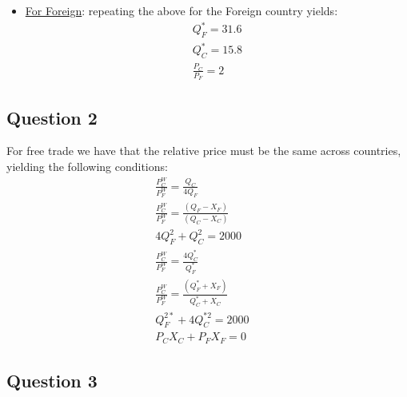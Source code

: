 \documentclass{article}
\begin{document}
\begin{itemize}
  \item  \underline{For Foreign}: repeating the above for the Foreign country yields:
  \begin{gather*}
    Q_{F}^{*} = 31.6 \\
    Q_{C}^{*} = 15.8 \\
    \tfrac{P_{C}}{P_{F}} = 2
  \end{gather*}

\end{itemize}


\par \vspace{0.8em}
\subsection{Question 2}

For free trade we have that the relative price must be the same across countries, yielding the following conditions:
\begin{align*}
  \tfrac{P_{C}^{W}}{P_{F}^{W}} = \tfrac{Q_{C}}{4Q_{F}} \ &\tag{1} \\
  \tfrac{P_{C}^{W}}{P_{F}^{W}} = \tfrac{(Q_{F}-X_{F})}{(Q_{C}-X_{C})} \ &\tag{2} \\
  4Q_{F}^{2} +  Q_{C}^{2} = 2000 \ &\tag{3} \\
  \tfrac{P_{C}^{W}}{P_{F}^{W}} = \tfrac{4Q_{C}^{*}}{Q_{F}^{*}} \ &\tag{4}  \\
  \tfrac{P_{C}^{W}}{P_{F}^{W}} = \tfrac{(Q_{F}^{*} + X_{F})}{Q_{C}^{*} + X_{C}} \ &\tag{5} \\
  Q_{F}^{2*} + 4Q_{C}^{*2} = 2000 \ &\tag{6} \\
  P_{C}X_{C} + P_{F}X_{F} = 0 \ &\tag{7}
\end{align*}

\par \vspace{0.8em}
\subsection{Question 3}
\end{document}
